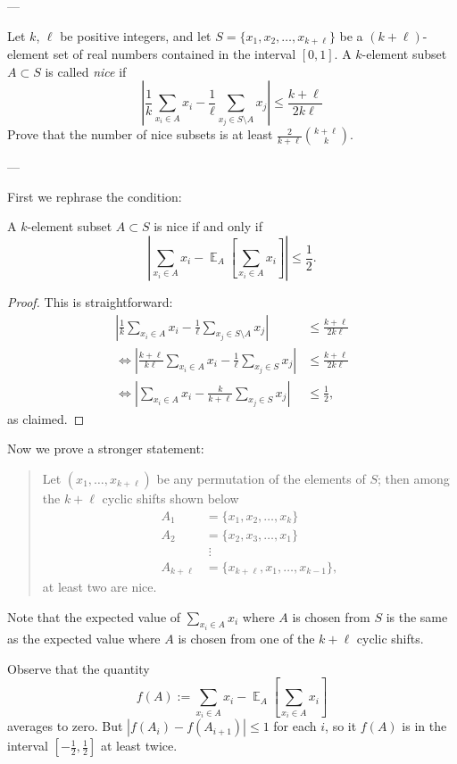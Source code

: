 
---

Let $k$, $\ell$ be positive integers, and let $S=\{x_1,x_2,\ldots,x_{k+\ell}\}$ be a $(k+\ell)$-element set of real numbers contained in the interval $[0,1]$. A $k$-element subset $A\subset S$ is called \emph{nice} if
\[\left\lvert\frac1k\sum_{x_i\in A}x_i-\frac1\ell\sum_{x_j\in S\setminus A}x_j\right\rvert\le\frac{k+\ell}{2k\ell}\]
Prove that the number of nice subsets is at least $\frac2{k+\ell}\binom{k+\ell}k$.

---

First we rephrase the condition:
\begin{claim*}
    A $k$-element subset $A\subset S$ is nice if and only if \[\left\lvert\sum_{x_i\in A}x_i-\mathop{\mathbb E}_A\left[\sum_{x_i\in A}x_i\right]\right\rvert\le\frac12.\]
\end{claim*}
\begin{proof}
    This is straightforward:
    \begin{align*}
        \left\lvert\frac1k\sum_{x_i\in A}x_i-\frac1\ell\sum_{x_j\in S\setminus A}x_j\right\rvert&\le\frac{k+\ell}{2k\ell}\\
        \iff\left\lvert\frac{k+\ell}{k\ell}\sum_{x_i\in A}x_i-\frac1\ell\sum_{x_j\in S}x_j\right\rvert&\le\frac{k+\ell}{2k\ell}\\
        \iff\left\lvert\sum_{x_i\in A}x_i-\frac k{k+\ell}\sum_{x_j\in S}x_j\right\rvert&\le\frac12,
    \end{align*}
    as claimed.
\end{proof}

Now we prove a stronger statement:
\begin{quote}
    Let $(x_1,\ldots,x_{k+\ell})$ be any permutation of the elements of $S$; then among the $k+\ell$ cyclic shifts shown below
    \begin{align*}
        A_1&=\{x_1,x_2,\ldots,x_k\}\\
        A_2&=\{x_2,x_3,\ldots,x_1\}\\
        &\;\vdots\\
        A_{k+\ell}&=\{x_{k+\ell},x_1,\ldots,x_{k-1}\},
    \end{align*}
    at least two are nice.
\end{quote}
Note that the expected value of $\sum_{x_i\in A}x_i$ where $A$ is chosen from $S$ is the same as the expected value where $A$ is chosen from one of the $k+\ell$ cyclic shifts.

Observe that the quantity \[f(A):=\sum_{x_i\in A}x_i-\mathop{\mathbb E}_A\left[\sum_{x_i\in A}x_i\right]\]
averages to zero. But $\left\lvert f(A_i)-f(A_{i+1})\right\rvert\le1$ for each $i$, so it $f(A)$ is in the interval $[-\frac12,\frac12]$ at least twice.

